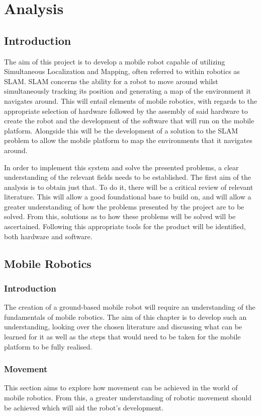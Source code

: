 \part{Analysis}
		\chapter{Introduction}
		The aim of this project is to develop a mobile robot capable of utilizing Simultaneous Localization and Mapping, often referred to within robotics as SLAM. SLAM concerns the ability for a robot to move around whilst simultaneously tracking its position and generating a map of the environment it navigates around. This will entail elements of mobile robotics, with regards to the appropriate selection of hardware followed by the assembly of said hardware to create the robot and the development of the software that will run on the mobile platform. Alongside this will be the development of a solution to the SLAM problem to allow the mobile platform to map the environments that it navigates around.
		
		In order to implement this system and solve the presented problems, a clear understanding of the relevant fields needs to be established. The first aim of the analysis is to obtain just that. To do it, there will be a critical review of relevant literature. This will allow a good foundational base to build on, and will allow a greater understanding of how the problems presented by the project are to be solved. From this, solutions as to how these problems will be solved will be ascertained. Following this appropriate tools for the product will be identified, both hardware and software.
		
		\chapter{Mobile Robotics}
		\label{litreview:mobilerobotics}
			\section{Introduction}
			The creation of a ground-based mobile robot will require an understanding of the fundamentals of mobile robotics. The aim of this chapter is to develop such an understanding, looking over the chosen literature and discussing what can be learned for it as well as the steps that would need to be taken for the mobile platform to be fully realised.
			
			\section{Movement}
			\label{litreview:movement}
			This section aims to explore how movement can be achieved in the world of mobile robotics. From this, a greater understanding of robotic movement should be achieved which will aid the robot's development.
			
